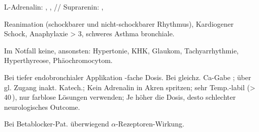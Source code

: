 {
\begin{MedikamentCharakteristika}
  \item[{\TxItemSpezialitaeten}] 
  L-Adrenalin: 
    , 
    , 
  //    
  Suprarenin{\texttrademark}: 
    , 
  \item[{\TxItemIndikation}] Reanimation (schockbarer und 
  nicht-schockbarer Rhythmus),
  Kardiogener Schock, Anaphylaxie > 3{\textdegree},  schweres Asthma 
  bronchiale.
  \item[{\TxItemKontraindikation}]Im Notfall keine, ansonsten:
  Hypertonie, KHK, Glaukom, Tachyarrhythmie, Hyperthyreose,
  Phäochromocytom.
%  
  \item[Anm] Bei tiefer endobronchialer Applikation 
  -fache Dosis.
  Bei gleichz. Ca-Gabe ;  über gl. Zugang 
  inakt.
  Katech.; Kein Adrenalin in Akren spritzen; sehr Temp.-labil
  ({\textgreater}\,40\,{\textcelsius}), nur farblose Lösungen 
  verwenden; Je höher die
  Dosis, desto schlechter neurologisches Outcome.
  \item[{\TxItemCave}] Bei Betablocker-Pat. überwiegend
  {$\alpha$}-Rezeptoren-Wirkung.
\end{MedikamentCharakteristika}
}
{}

